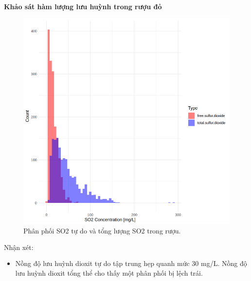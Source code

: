 \textbf{Khảo sát hàm lượng lưu huỳnh trong rượu đỏ}
\begin{figure}[H]
    \centering
    \includegraphics[width=0.75\columnwidth]{wine_figures/red_sulfur_dis.png}
    \caption{Phân phối SO2 tự do và tổng lượng SO2 trong rượu.}
    \label{fig:red_sulfur_dis}
\end{figure}
Nhận xét:
\begin{itemize}
    \item Nồng độ lưu huỳnh dioxit tự do tập trung hẹp quanh mức 30 mg/L. Nồng độ lưu huỳnh dioxit tổng thể cho thấy một phân phối bị lệch trái.
\end{itemize}

